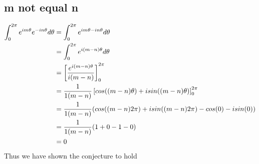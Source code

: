 \documentclass[notitlepage]{article}
\begin{document}
\subsection*{m not equal n}
\begin{equation}
    \begin{aligned}
        \int_0^{2\pi}{e^{im\theta}e^{-in\theta}d\theta}     &= \int_0^{2\pi}{e^{im\theta - in\theta}d\theta} \notag \\
                                                            &= \int_0^{2\pi}{e^{i(m-n)\theta}d\theta} \\
                                                            &= \left[\frac{e^{i(m-n)\theta}}{i(m-n)}\right]_0^{2\pi} \\
                                                            &= \frac{1}{1(m-n)}\left[cos((m-n)\theta)+isin((m-n)\theta)\right]_0^{2\pi} \\
                                                            &= \frac{1}{1(m-n)}(cos((m-n)2\pi)+isin((m-n)2\pi)-cos(0)-isin(0)) \\
                                                            &= \frac{1}{1(m-n)}(1+0-1-0) \\
                                                            &= 0
    \end{aligned}
\end{equation}
    Thus we have shown the conjecture to hold
\end{document}
